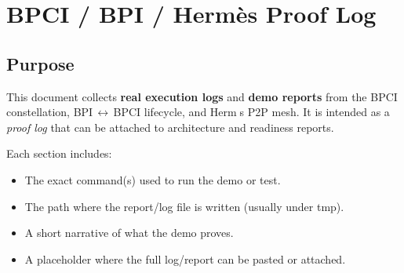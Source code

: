 
\usepackage[margin=1in]{geometry}
\usepackage[T1]{fontenc}
\usepackage[utf8]{inputenc}
\usepackage{hyperref}
\usepackage{courier}
\usepackage{listings}
\usepackage{longtable}

\lstset{
  basicstyle=\footnotesize\ttfamily,
  breaklines=true,
  columns=fullflexible,
}

% 

\setcounter{chapter}{1}

\chapter{BPCI / BPI / Herm\`es Proof Log}

\section{Purpose}

This document collects \textbf{real execution logs} and \textbf{demo reports} from the BPCI constellation, BPI\,$\leftrightarrow$\,BPCI lifecycle, and Herms P2P mesh. It is intended as a \emph{proof log} that can be attached to architecture and readiness reports.

Each section includes:

\begin{itemize}
  \item The exact command(s) used to run the demo or test.
  \item The path where the report/log file is written (usually under \/tmp).
  \item A short narrative of what the demo proves.
  \item A placeholder where the full log/report can be pasted or attached.
\end{itemize}

